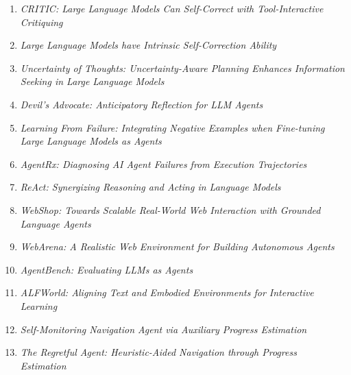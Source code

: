 \begin{enumerate}
\item \emph{CRITIC: Large Language Models Can Self-Correct with Tool-Interactive Critiquing}~\cite{gou2024critic}
\item \emph{Large Language Models have Intrinsic Self-Correction Ability}~\cite{liu2024intrinsicselfcorrection}
\item \emph{Uncertainty of Thoughts: Uncertainty-Aware Planning Enhances Information Seeking in Large Language Models}~\cite{hu2024uncertainty}
\item \emph{Devil's Advocate: Anticipatory Reflection for LLM Agents}~\cite{wang2024devils}
\item \emph{Learning From Failure: Integrating Negative Examples when Fine-tuning Large Language Models as Agents}~\cite{wang2024learningfromfailure}
\item \emph{AgentRx: Diagnosing AI Agent Failures from Execution Trajectories}~\cite{barke2026agentrx}
\item \emph{ReAct: Synergizing Reasoning and Acting in Language Models}~\cite{yao2023react}
\item \emph{WebShop: Towards Scalable Real-World Web Interaction with Grounded Language Agents}~\cite{yao2022webshop}
\item \emph{WebArena: A Realistic Web Environment for Building Autonomous Agents}~\cite{zhou2023webarena}
\item \emph{AgentBench: Evaluating LLMs as Agents}~\cite{liu2024agentbench}
\item \emph{ALFWorld: Aligning Text and Embodied Environments for Interactive Learning}~\cite{shridhar2021alfworld}
\item \emph{Self-Monitoring Navigation Agent via Auxiliary Progress Estimation}~\cite{ma2019selfmonitoring}
\item \emph{The Regretful Agent: Heuristic-Aided Navigation through Progress Estimation}~\cite{ma2019theregretful}
\end{enumerate}

